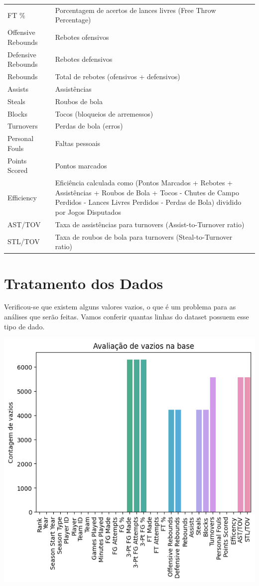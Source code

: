 \documentclass[
]{book}
\begin{document}
\begin{longtable}[]{@{}
  >{\raggedright\arraybackslash}p{}
  >{\raggedright\arraybackslash}p{}@{}}
FT \% & Porcentagem de acertos de lances livres (Free Throw Percentage) \\
Offensive Rebounds & Rebotes ofensivos \\
Defensive Rebounds & Rebotes defensivos \\
Rebounds & Total de rebotes (ofensivos + defensivos) \\
Assists & Assistências \\
Steals & Roubos de bola \\
Blocks & Tocos (bloqueios de arremessos) \\
Turnovers & Perdas de bola (erros) \\
Personal Fouls & Faltas pessoais \\
Points Scored & Pontos marcados \\
Efficiency & Eficiência calculada como (Pontos Marcados + Rebotes + Assistências + Roubos de Bola + Tocos - Chutes de Campo Perdidos - Lances Livres Perdidos - Perdas de Bola) dividido por Jogos Disputados \\
AST/TOV & Taxa de assistências para turnovers (Assist-to-Turnover ratio) \\
STL/TOV & Taxa de roubos de bola para turnovers (Steal-to-Turnover ratio) \\
\bottomrule()
\end{longtable}

\hypertarget{tratamento-dos-dados}{%
\chapter{Tratamento dos Dados}\label{tratamento-dos-dados}}

Verificou-se que existem alguns valores vazios, o que é um problema para as análises que serão feitas. Vamos conferir quantas linhas do dataset possuem esse tipo de dado.

\includegraphics{imagens/1.png}
\end{document}
